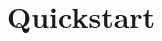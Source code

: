 \documentclass[Orbiter User Manual.tex]{subfiles}
\begin{document}
\section{Quickstart}
\end{document}
